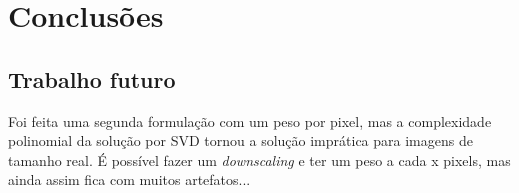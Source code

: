 \documentclass[cic,tc]{iiufrgs}
\begin{document}
\begin{table}[h]
\begin{tabular}{c|c|c|c}
          \hline
        \end{tabular}
    \label{tbl:results1}
\end{table}


\chapter{Conclusões}

\section{Trabalho futuro}
Foi feita uma segunda formulação com um peso por pixel, mas a complexidade polinomial da solução por SVD tornou a solução imprática para imagens de tamanho real. É possível fazer um \textit{downscaling} e ter um peso a cada x pixels, mas ainda assim fica com muitos artefatos...



\end{document}
